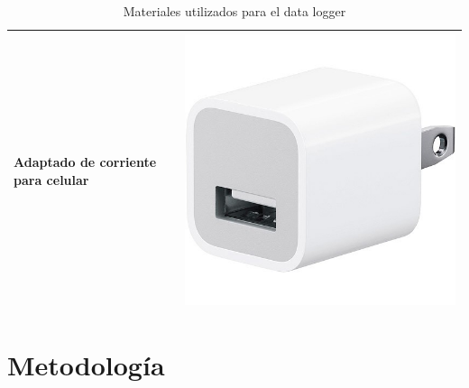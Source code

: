 \documentclass[11pt,twocolumn,letterpaper,spanish]{article}
\begin{document}
\begin{table}[hbt!]
\begin{tabular}{ m{6cm}  m{3.5cm} }
      Adaptado de corriente para celular & \includegraphics[align=t,scale=0.10]{Materiales/adaptador}\\
    \bottomrule
  \end{tabular}
  \caption{Materiales utilizados para el data logger}
\end{table}


\section*{Metodología}
\end{document}
